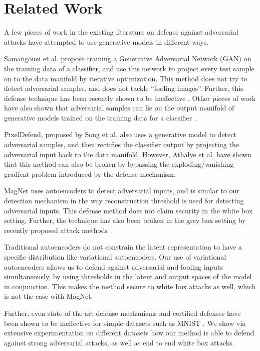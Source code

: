 \documentclass[letterpaper]{article} %
\begin{document}
\section{Related Work}
A few pieces of work in the existing literature on defense against adversarial attacks have attempted to use generative models in different ways.

Samangouei et al.  propose training a Generative Adversarial Network (GAN) on the training data of a classifier, and use this network to project every test sample on to the data manifold by iterative optimization. This method does not try to detect adversarial samples, and does not tackle ``fooling images''. Further, this defense technique has been recently shown to be ineffective . Other pieces of work have also shown that adversarial samples can lie on the output manifold of generative models trained on the training data for a classifier .

PixelDefend, proposed by Song et al.  also uses a generative model to detect adversarial samples, and then rectifies the classifier output by projecting the adversarial input back to the data manifold. However, Athalye et al. have shown that this method can also be broken by bypassing the exploding/vanishing gradient problem introduced by the defense mechanism.

MagNet  uses autoencoders to detect adversarial inputs, and is similar to our detection mechanism in the way reconstruction threshold is used for detecting adversarial inputs. This defense method does not claim security in the white box setting. Further, the technique has also been broken in the grey box setting by recently proposed attack methods .

Traditional autoencoders do not constrain the latent representation to have a specific distribution like variational autoencoders. Our use of variational autoencoders allows us to defend against adversarial and fooling inputs simultaneously, by using thresholds in the latent and output spaces of the model in conjunction. This makes the method secure to white box attacks as well, which is not the case with MagNet.

Further, even state of the art defense mechanisms  and certified defenses have been shown to be ineffective for simple datasets such as MNIST . We show via extensive experimentation on different datasets how our method is able to defend against strong adversarial attacks, as well as end to end white box attacks.
\end{document}
